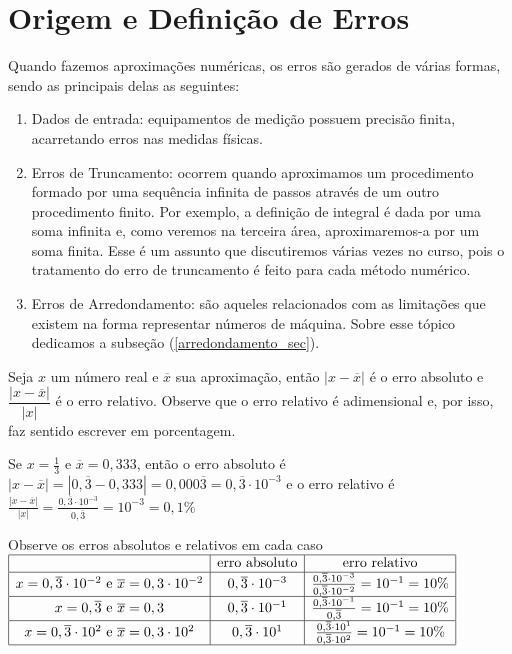 \section{Origem e Definição de Erros}
Quando fazemos aproximações numéricas, os erros são gerados de várias formas, sendo as principais delas as seguintes:
\begin{enumerate}
 \item Dados de entrada: equipamentos de medição possuem precisão finita, acarretando erros nas medidas físicas.
 \item Erros de Truncamento: ocorrem quando aproximamos um procedimento formado por uma sequência infinita de passos através de um outro procedimento finito. Por exemplo, a definição de integral é dada por uma soma infinita e, como veremos na terceira área, aproximaremos-a por um soma finita. Esse é um assunto que discutiremos várias vezes no curso, pois o tratamento do erro de truncamento é feito para cada método numérico.
 \item Erros de Arredondamento: são aqueles relacionados com as limitações que existem na forma representar números de máquina. Sobre esse tópico dedicamos a subseção (\ref{arredondamento_sec}).
\end{enumerate}


\begin{defn} Seja $x$ um número real e $\overline{x}$ sua aproximação, então $|x-\overline{x}|$ é o erro absoluto e $\dfrac{|x-\overline{x}|}{|x|}$ é o erro relativo. Observe que o erro relativo é adimensional e, por isso, faz sentido escrever em porcentagem.
\end{defn}
\begin{ex}
Se $x=\frac{1}{3}$ e $\overline{x}=0,333$, então o erro absoluto é
$
|x-\overline{x}|=|0,\overline{3}-0,333|=0,000\overline{3}=0,\overline{3}\cdot 10^{-3}
$
e o erro relativo é
$
\frac{|x-\overline{x}|}{|x|}=\frac{0,\overline{3}\cdot 10^{-3}}{0,\overline{3}}=10^{-3}=0,1\%
$
\end{ex}

\begin{ex}
Observe os erros absolutos e relativos em cada caso
$
\begin{array}{|c|c|c|}
\hline
&\hbox{erro absoluto}&\hbox{erro relativo}\\
\hline
x=0,\overline{3}\cdot 10^{-2}\ \hbox{e}\ \overline{x}=0,3\cdot 10^{-2}&0,\overline{3}\cdot 10^{-3}&\frac{0,\overline{3}\cdot 10^{-3}}{0,\overline{3}\cdot 10^{-2}}=10^{-1}=10\%\\
\hline
x=0,\overline{3}\ \hbox{e}\ \overline{x}=0,3&0,\overline{3}\cdot 10^{-1}&\frac{0,\overline{3}\cdot 10^{-1}}{0,\overline{3}}=10^{-1}=10\%\\
\hline
x=0,\overline{3}\cdot 10^{2}\ \hbox{e}\ \overline{x}=0,3\cdot 10^{2}&0,\overline{3}\cdot 10^{1}&\frac{0,\overline{3}\cdot 10^{1}}{0,\overline{3}\cdot 10^{2}}=10^{-1}=10\%\\
\hline
\end{array}
$
\end{ex}

